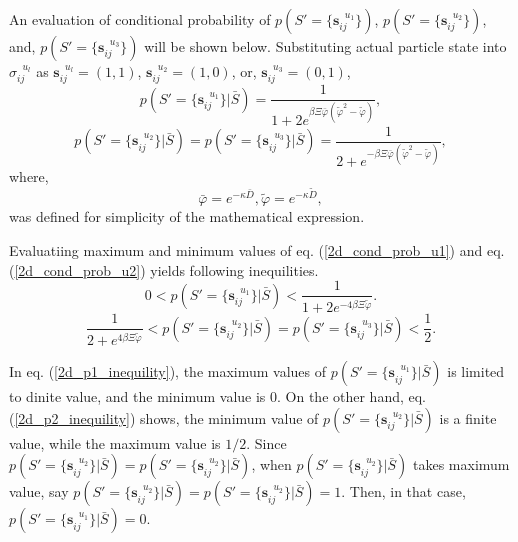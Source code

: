\documentclass{article}
\begin{document}
An evaluation of conditional probability of $p(S'=\{\bm{s}_{ij}^{\mspace{10mu}u_1}\})$, $p(S'=\{\bm{s}_{ij}^{\mspace{10mu}u_2}\})$, and,
$p(S'=\{\bm{s}_{ij}^{\mspace{10mu}u_3}\})$ will be shown below.
Substituting actual particle state into $\sigma_{ij}^{\mspace{10mu}u_l}$ as $\bm{s}_{ij}^{\mspace{10mu}u_l} = (1, 1)$, 
$\bm{s}_{ij}^{\mspace{10mu}u_2} = (1, 0)$, or, $\bm{s}_{ij}^{\mspace{10mu}u_3} = (0, 1)$,
\begin{equation}
 p\left(S'=\{\bm{s}^{\mspace{10mu}u_1}_{ij}\}|\bar{S}\right) = 
  \frac{1}{1
  + 2e^{\beta\Xi\bar{\varphi}(\tilde{\varphi}^2 - \tilde{\varphi})}
  }, \label{2d_cond_prob_u1}
\end{equation}
\begin{equation}
 p\left(S'=\{\bm{s}^{\mspace{10mu}u_2}_{ij}\}|\bar{S}\right) = p\left(S'=\{\bm{s}^{\mspace{10mu}u_3}_{ij}\}|\bar{S}\right) = 
  \frac{1}{2
  + e^{-\beta\Xi\bar{\varphi}(\tilde{\varphi}^2 - \tilde{\varphi})}
  }, \label{2d_cond_prob_u2}
\end{equation}
where, 
\begin{equation}
 \bar{\varphi} = e^{-\kappa\bar{D}}, \tilde{\varphi} = e^{-\kappa\tilde{D}}, 
\end{equation}
was defined for simplicity of the mathematical expression.

Evaluatiing maximum and minimum values of eq. (\ref{2d_cond_prob_u1}) and eq. (\ref{2d_cond_prob_u2}) yields following inequilities.
\begin{equation}
 0 < p\left(S'=\{\bm{s}^{\mspace{10mu}u_1}_{ij}\}|\bar{S}\right) < 
  \frac{1}{1 + 2e^{-4\beta\Xi\tilde{\varphi}}}. \label{2d_p1_inequility}
\end{equation}
\begin{equation}
 \frac{1}{2 + e^{4\beta\Xi\tilde{\varphi}}} < p\left(S'=\{\bm{s}^{\mspace{10mu}u_2}_{ij}\}|\bar{S}\right)
 = p\left(S'=\{\bm{s}^{\mspace{10mu}u_3}_{ij}\}|\bar{S}\right) < \frac{1}{2}. \label{2d_p2_inequility}
\end{equation}

In eq. (\ref{2d_p1_inequility}), the maximum values of $p\left(S'=\{\bm{s}^{\mspace{10mu}u_1}_{ij}\}|\bar{S}\right)$ is 
limited to dinite value, and the minimum value is 0.
On the other hand, eq. (\ref{2d_p2_inequility}) shows, the minimum value of $p\left(S'=\{\bm{s}^{\mspace{10mu}u_2}_{ij}\}|\bar{S}\right)$ is
a finite value, while the maximum value is $1/2$. 
Since $p\left(S'=\{\bm{s}^{\mspace{10mu}u_2}_{ij}\}|\bar{S}\right) = p\left(S'=\{\bm{s}^{\mspace{10mu}u_2}_{ij}\}|\bar{S}\right)$,
when $p\left(S'=\{\bm{s}^{\mspace{10mu}u_2}_{ij}\}|\bar{S}\right)$ takes maximum value, 
say $p\left(S'=\{\bm{s}^{\mspace{10mu}u_2}_{ij}\}|\bar{S}\right) = p\left(S'=\{\bm{s}^{\mspace{10mu}u_2}_{ij}\}|\bar{S}\right) = 1$.
Then, in that case, $p\left(S'=\{\bm{s}^{\mspace{10mu}u_1}_{ij}\}|\bar{S}\right) = 0$.
\end{document}
